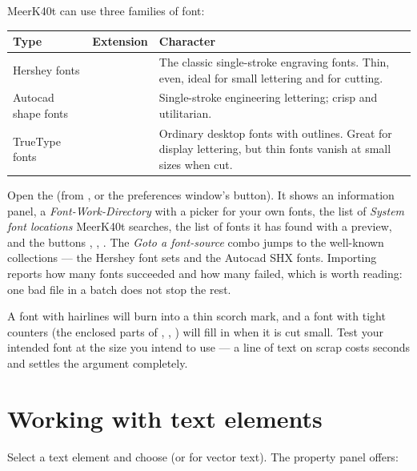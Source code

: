 MeerK40t can use three families of font:

\begin{center}\small
\begin{tabular}{@{}L{2.4cm}L{4.0cm}L{7.8cm}@{}}
\toprule
\textbf{Type} & \textbf{Extension} & \textbf{Character} \\
\midrule
Hershey fonts &  & The classic single-stroke engraving fonts. Thin,
even, ideal for small lettering and for cutting. \\
Autocad shape fonts &  & Single-stroke engineering lettering; crisp
and utilitarian. \\
TrueType fonts &  & Ordinary desktop fonts with outlines. Great for
display lettering, but thin fonts vanish at small sizes when cut. \\
\bottomrule
\end{tabular}
\end{center}

\noindent Open the  (from , or
the preferences window's  button). It shows an information panel, a
\emph{Font-Work-Directory} with a picker for your own fonts, the list of
\emph{System font locations} MeerK40t searches, the list of fonts it has found
with a preview, and the buttons , , . The
\emph{Goto a font-source} combo jumps to the well-known collections --- the
Hershey font sets and the Autocad SHX fonts. Importing reports how many fonts
succeeded and how many failed, which is worth reading: one bad file in a batch
does not stop the rest.

\begin{tipbox}
A font with hairlines will burn into a thin scorch mark, and a font with tight
counters (the enclosed parts of , , ) will fill in when it
is cut small. Test your intended font at the size you intend to use --- a line of
text on scrap costs seconds and settles the argument completely.
\end{tipbox}

\section{Working with text elements}

Select a text element and choose  (or  for vector text). The property panel offers:

